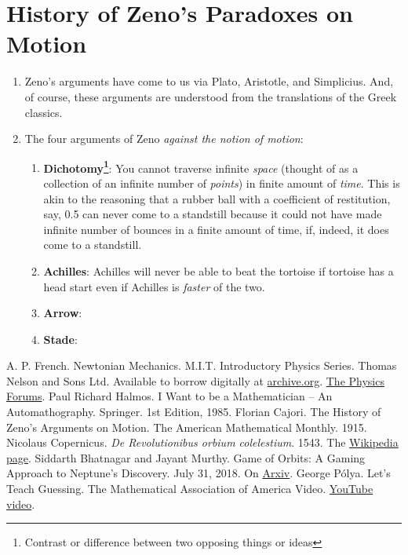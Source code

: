 \documentclass[12pt,a4paper]{report}
\begin{document}
\chapter{History of Zeno's Paradoxes on Motion}
\label{zeno}
\begin{enumerate}
    \item Zeno's arguments have come to us via Plato, Aristotle, and Simplicius. And, of course, these arguments are understood from the translations of the Greek classics.
    \item The four arguments of Zeno \emph{against the notion of motion}:
        \begin{enumerate}
            \item \textbf{Dichotomy\footnote{Contrast or difference between two opposing things or ideas}}: You cannot traverse infinite \emph{space} (thought of as a collection of an infinite number of \emph{points}) in finite amount of \emph{time}. This is akin to the reasoning that a rubber ball with a coefficient of restitution, say, 0.5 can never come to a standstill because it could not have made infinite number of bounces in a finite amount of time, if, indeed, it does come to a standstill.
            \item \textbf{Achilles}: Achilles will never be able to beat the tortoise if tortoise has a head start even if Achilles is \emph{faster} of the two.
            \item \textbf{Arrow}:
            \item \textbf{Stade}:
        \end{enumerate}
\end{enumerate}


\begin{thebibliography}{00}
     A. P. French. Newtonian Mechanics. M.I.T. Introductory Physics Series. Thomas Nelson and Sons Ltd. Available to borrow digitally at \href{http://archive.org}{archive.org}.
     \href{https://physicsforums.com}{The Physics Forums}.
     Paul Richard Halmos. I Want to be a Mathematician -- An Automathography. Springer. 1st Edition, 1985.
     Florian Cajori. The History of Zeno's Arguments on Motion. The American Mathematical Monthly. 1915.
     Nicolaus Copernicus. \textit{De Revolutionibus orbium colelestium}. 1543. The \href{https://en.wikipedia.org/wiki/Nicolaus_Copernicus#The_book}{Wikipedia page}.
     Siddarth Bhatnagar and Jayant Murthy. Game of Orbits: A Gaming Approach to Neptune's Discovery. July 31, 2018. On \href{https://arxiv.org/pdf/1807.11280.pdf}{Arxiv}.
     George P{\'o}lya. Let's Teach Guessing. The Mathematical Association of America Video. \href{https://www.youtube.com/watch?v=h0gbw-Ur_do}{YouTube video}.
\end{thebibliography}
\end{document}

